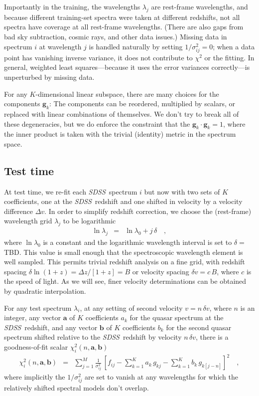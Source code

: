 \documentclass[preprint]{aastex}
\newcommand{\project}[1]{\textsl{#1}}
\newcommand{\SDSS}{\project{SDSS}}
\newcommand{\mmatrix}[1]{\boldsymbol{#1}}
\newcommand{\avec}{\mmatrix{a}}
\newcommand{\bvec}{\mmatrix{b}}
\newcommand{\gvec}{\mmatrix{g}}
\begin{document}
Importantly in the training, the wavelengths $\lambda_j$ are
rest-frame wavelengths, and because different training-set spectra
were taken at different redshifts, not all spectra have coverage at
all rest-frame wavelengths.  (There are also gaps from bad sky
subtraction, cosmic rays, and other data issues.)  Missing data in
spectrum $i$ at wavelength $j$ is handled naturally by setting
$1/\sigma^2_{ij}=0$; when a data point has vanishing inverse
variance, it does not contribute to $\chi^2$ or the fitting.  In
general, weighted least squares---because it uses the error variances
correctly---is unperturbed by missing data.

For any $K$-dimensional linear subspace, there are many choices for
the components $\gvec_k$: The components can be reordered, multiplied
by scalars, or replaced with linear combinations of themselves.  We
don't try to break all of these degeneracies, but we do enforce the
constraint that the $\gvec_k\cdot\gvec_k=1$, where the inner product
is taken with the trivial (identity) metric in the spectrum space.

\subsection{Test time}

At test time, we re-fit each \SDSS\ spectrum $i$ but now with two sets
of $K$ coefficients, one at the \SDSS\ redshift and one shifted in
velocity by a velocity difference $\Delta v$.  In order to simplify
redshift correction, we choose the (rest-frame) wavelength grid
$\lambda_j$ to be logarithmic
\begin{eqnarray}\displaystyle
\ln\lambda_j &=& \ln\lambda_0 + j\,\delta
\quad ,
\end{eqnarray}
where $\ln\lambda_0$ is a constant and the logarithmic wavelength
interval is set to $\delta=$TBD.  This value is small enough that the
spectroscopic wavelength element is well sampled.  This permits
trivial redshift analysis on a fine grid, with redshift spacing
$\delta\ln(1+z)=\Delta z/[1+z]=B$ or velocity spacing $\delta v=c\,B$,
where $c$ is the speed of light.  As we will see, finer velocity
determinations can be obtained by quadratic interpolation.

For any test spectrum $\lambda_i$, at any setting of second velocity
$v= n\,\delta v$, where $n$ is an integer, any vector $\avec$ of $K$
coefficients $a_k$ for the quasar spectrum at the \SDSS\ redshift, and
any vector $\bvec$ of $K$ coefficients $b_k$ for the second quasar
spectrum shifted relative to the \SDSS\ redshift by velocity
$n\,\delta v$, there is a goodness-of-fit scalar
$\chi^2_i(n,\avec,\bvec)$
\begin{eqnarray}\displaystyle
\chi^2_i(n,\avec,\bvec) &=& \sum_{j=1}^{M} \frac{1}{\sigma^2_{ij}}
 \,\left[f_{ij} - \sum_{k=1}^K a_k\,g_{kj} - \sum_{k=1}^K b_k\,g_{k[j-n]}\right]^2
\quad,
\end{eqnarray}
where implicitly the $1/\sigma^2_{ij}$ are set to vanish at any
wavelengths for which the relatively shifted spectral models don't
overlap.
\end{document}
